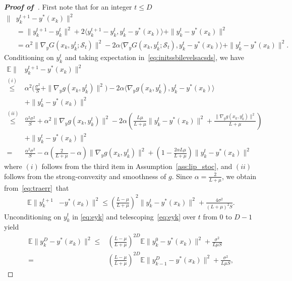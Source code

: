 \documentclass{osudissert96}
\def\gS{{\mathcal{S}}}
\begin{document}
\begin{proof}[\bf Proof of~] First note that for an integer $t\leq D$
{\small
\begin{align}\label{eq:initssbilevelsacsds}
\|&y_k^{t+1}-y^*(x_k) \|^2 \nonumber
\\&= \|y_k^{t+1}-y_k^t\|^2 + 2\langle y_k^{t+1}-y_k^t,  y_k^t-y^*(x_k) \rangle + \| y_k^t-y^*(x_k)\|^2 \nonumber
\\&= \alpha^2\| \nabla_y G(x_k,y_k^{t}; \gS_t) \|^2 -  2\alpha\langle  \nabla_y G(x_k,y_k^{t}; \gS_t),  y_k^t-y^*(x_k) \rangle +\| y_k^t-y^*(x_k)\|^2.
\end{align}}
\hspace{-0.15cm}Conditioning on $y_k^t$ and taking expectation in~\cref{eq:initssbilevelsacsds}, we have 
\begin{align}\label{eq:traerr}
\mathbb{E}\|&y_k^{t+1}-y^*(x_k) \|^2  \nonumber
\\\overset{(i)}\leq& \alpha^2 \Big(\frac{\sigma^2}{S} + \|\nabla_y g(x_k,y_k^t)\|^2 \Big) - 2\alpha \langle  \nabla_y g(x_k,y_k^{t}),  y_k^t-y^*(x_k) \rangle  \nonumber
\\&+\| y_k^t-y^*(x_k)\|^2 \nonumber
\\\overset{(ii)}\leq&\frac{\alpha^2\sigma^2}{S} + \alpha^2\|\nabla_y g(x_k,y_k^t)\|^2 - 2\alpha\left(  \frac{L\mu}{L+\mu} \|y_k^t-y^*(x_k)\|^2+\frac{\|\nabla_y g(x_k,y_k^t)\|^2}{L+\mu} \right) \nonumber
\\&+\| y_k^t-y^*(x_k)\|^2  \nonumber
\\=& \frac{\alpha^2\sigma^2}{S} - \alpha\left(\frac{2}{L+\mu}-\alpha\right)\|\nabla_y g(x_k,y_k^t)\|^2 + \left(1-\frac{2\alpha L\mu}{L+\mu} \right)\|y_k^t-y^*(x_k)\|^2
\end{align}
where $(i)$ follows from the third item in Assumption~\ref{ass:lip_stoc}, and $(ii)$ follows from the strong-convexity and smoothness of $g$. Since $\alpha=\frac{2}{L+\mu}$, we obtain from~\cref{eq:traerr}~that  
\begin{align}\label{eq:eyk}
\mathbb{E}\|y_k^{t+1}&-y^*(x_k) \|^2\leq \left(\frac{L-\mu}{L+\mu} \right)^2\|y_k^t-y^*(x_k)\|^2 + \frac{4\sigma^2}{(L+\mu)^2S}.
\end{align}
Unconditioning on $y^t_k$ in \cref{eq:eyk} and telescoping~\cref{eq:eyk} over $t$ from $0$ to $D-1$ yield
\begin{align}\label{eq:yjtt}
\mathbb{E}\|y_k^{D}-y^*(x_k) \|^2 \leq &  \left(\frac{L-\mu}{L+\mu}\right)^{2D}\mathbb{E}\|y^0_k-y^*(x_k)\|^2 + \frac{\sigma^2}{L\mu S} \nonumber
\\ = & \left(\frac{L-\mu}{L+\mu}\right)^{2D}\mathbb{E}\|y^D_{k-1}-y^*(x_k)\|^2 + \frac{\sigma^2}{L\mu S},

\end{align}
\end{proof}
\end{document}
